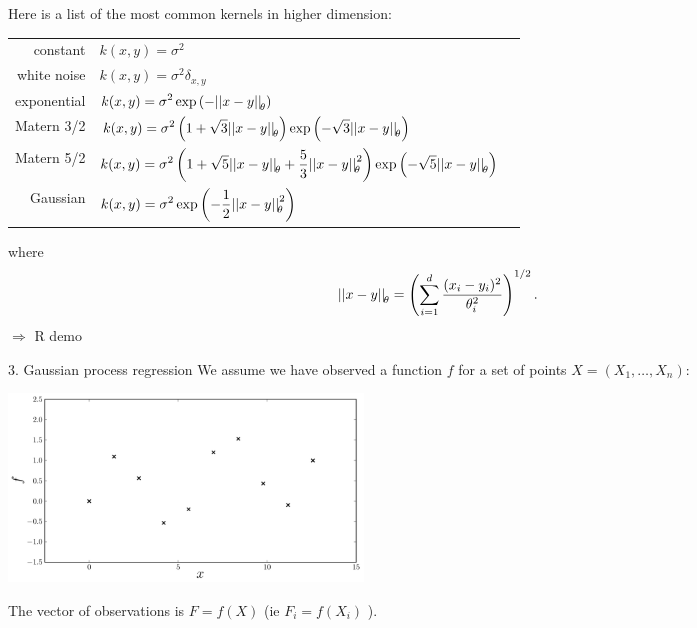 \begin{frame}{}
Here is a list of the most common kernels in higher dimension:\\
\vspace{2mm}
\footnotesize
\begin{tabular}{rlN}
		constant & $ \displaystyle k(x,y) = \sigma^2 $ &\\[4mm]
		white noise & $ \displaystyle k(x,y) = \sigma^2 \delta_{x,y} $ &\\[4mm]
		exponential & $\displaystyle k(x,y) = \sigma^2 \exp \left(- {|| x-y ||}_{\! \theta} \right)$ &\\[4mm]
		Matern 3/2 & $\displaystyle k(x,y) = \sigma^2 \left(1 + \sqrt{3}{|| x-y ||}_{\! \theta} \right) \exp \left(- \sqrt{3}{|| x-y ||}_{\! \theta}  \right)$ &\\[4mm]
		Matern 5/2 & $\displaystyle k(x,y) = \sigma^2 \left(1 + \sqrt{5}{|| x-y ||}_{\! \theta} + \frac{5}{3}{|| x-y ||}_{\! \theta}^2 \right) \exp \left(- \sqrt{5}{|| x-y ||}_{\! \theta} \right)$ &\\[4mm]
		Gaussian & $\displaystyle k(x,y) = \sigma^2 \exp \left(- \frac12 {|| x-y ||}_{\! \theta}^2 \right)$ &\\[4mm]
\end{tabular}
\normalsize where
\begin{equation*}
	{|| x-y ||}_{\! \theta} = \left( \sum_{i=1}^d \frac{(x_i-y_i)^2}{\theta_i^2} \right)^{1/2}.
\end{equation*}
\alert{$\Rightarrow$ R demo}
\end{frame}


\begin{frame}{3. Gaussian process regression}
We assume we have observed a function $f$ for a set of points $X = (X_1,\dots,X_n)$:
\begin{center}
\includegraphics[height=5cm]{1_stat_models/figures/R/Fig1-data}
\end{center}
The vector of observations is $F=f(X)$ (ie $F_i = f(X_i)$ ).
\end{frame}

